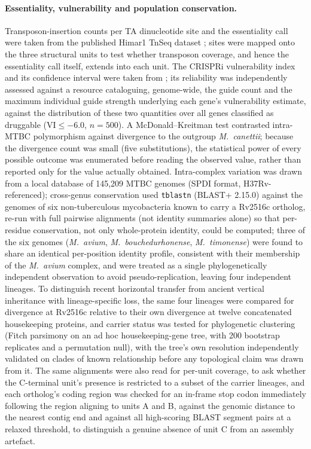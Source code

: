 \documentclass[11pt,a4paper]{article}
\begin{document}
\paragraph{Essentiality, vulnerability and population conservation.} Transposon-insertion counts
per TA dinucleotide site and the essentiality call were taken from the published Himar1 TnSeq
dataset \citep{dejesus2017essentiality}; sites were mapped onto the three structural units to test
whether transposon coverage, and hence the essentiality call itself, extends into each unit. The
CRISPRi vulnerability index and its confidence interval were taken from \citet{bosch2021vulnerability};
its reliability was independently assessed against a resource cataloguing, genome-wide, the guide
count and the maximum individual guide strength underlying each gene's vulnerability estimate,
against the distribution of these two quantities over all genes classified as druggable
($\text{VI}\leq-6.0$, $n=500$). A McDonald--Kreitman test contrasted intra-MTBC polymorphism against
divergence to the outgroup \textit{M.\ canettii}; because the divergence count was small (five
substitutions), the statistical power of every possible outcome was enumerated before reading the
observed value, rather than reported only for the value actually obtained. Intra-complex variation
was drawn from a
local database of 145{,}209 MTBC genomes (SPDI format, H37Rv-referenced); cross-genus conservation
used \texttt{tblastn} (BLAST+ 2.15.0) against the genomes of six non-tuberculous mycobacteria known to carry a
Rv2516c ortholog, re-run with full pairwise alignments (not identity summaries alone) so that
per-residue conservation, not only whole-protein identity, could be computed; three of the six
genomes (\textit{M.\ avium}, \textit{M.\ bouchedurhonense}, \textit{M.\ timonense}) were found to
share an identical per-position identity profile, consistent with their membership of the
\textit{M.\ avium} complex, and were treated as a single phylogenetically independent observation
to avoid pseudo-replication, leaving four independent lineages. To distinguish recent horizontal
transfer from ancient vertical inheritance with lineage-specific loss, the same four lineages were
compared for divergence at Rv2516c relative to their own divergence at twelve concatenated
housekeeping proteins, and carrier status was tested for phylogenetic clustering (Fitch parsimony
on an ad hoc housekeeping-gene tree, with 200 bootstrap replicates and a permutation null), with the
tree's own resolution independently validated on clades of known relationship before any
topological claim was drawn from it. The same alignments were also read for per-unit coverage,
to ask whether the C-terminal unit's presence is restricted to a subset of the carrier lineages,
and each ortholog's coding region was checked for an in-frame stop codon immediately following the
region aligning to units A and B, against the genomic distance to the nearest contig end and against
all high-scoring BLAST segment pairs at a relaxed threshold, to distinguish a genuine absence of
unit C from an assembly artefact.
\end{document}
